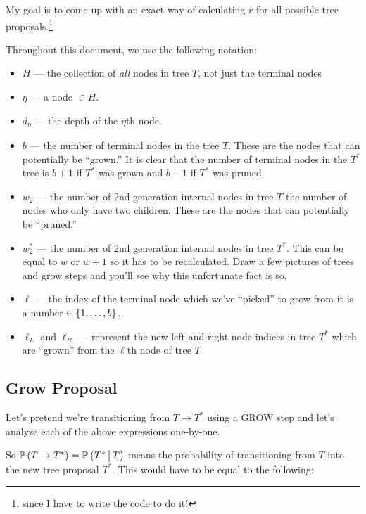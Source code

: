 My goal is to come up with an exact way of calculating $r$ for all possible tree proposals.\footnote{since I have to write the code to do it!} \pagebreak

Throughout this document, we use the following notation:

\begin{itemize}
\item $H$ ---  the collection of \textit{all} nodes in tree $T$, not just the terminal nodes
\item $\eta$ --- a node $\in H$.
\item $d_\eta$ --- the depth of the $\eta$th node.
\item $b$ --- the number of terminal nodes in the tree $T$. These are the nodes that can potentially be ``grown.'' It is clear that the number of terminal nodes in the $T^*$ tree is $b+1$ if $T^*$ was grown and $b-1$ if $T^*$ was pruned.
\item $w_2$ --- the number of 2nd generation internal nodes in tree $T$ \ie the number of nodes who only have two children. These are the nodes that can potentially be ``pruned.''
\item $w_2^*$ --- the number of 2nd generation internal nodes in tree $T^*$. This can be equal to $w$ or $w+1$ so it has to be recalculated. Draw a few pictures of trees and grow steps and you'll see why this unfortunate fact is so.
\item  $\ell$ --- the index of the terminal node which we've ``picked'' to grow from it is a number $\in \left\{1, \ldots, b\right\}$.
\item $\ell_L$ and $\ell_R$ --- represent the new left and right node indices in tree $T^*$ which are ``grown'' from the $\ell$th node of tree $T$
\end{itemize}

\subsection*{Grow Proposal}

Let's pretend we're transitioning from $T \rightarrow T^*$ using a GROW step and let's analyze each of the above expressions one-by-one.



So $\mathbb{P}\left(T \rightarrow T^*\right) = \mathbb{P}\left(T^* \, \big| \, T\right)$ means the probability of transitioning from $T$ into the new tree proposal $T^*$. This would have to be equal to the following:

